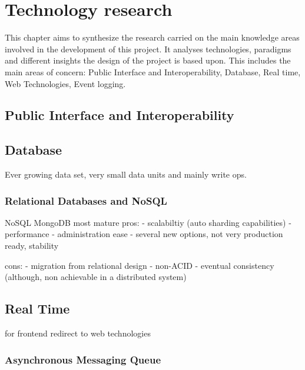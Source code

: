 \chapter{Technology research}

This chapter aims to synthesize the research carried on the main knowledge areas involved in the development of this project. It analyses technologies, paradigms and different insights the design of the project is based upon. This includes the main areas of concern: Public Interface and Interoperability, Database, Real time, Web Technologies, Event logging.   

\section{Public Interface and Interoperability}

\section{Database}

Ever growing data set, very small data units and mainly write ops.

\subsection{Relational Databases and NoSQL}

NoSQL
MongoDB most mature
pros:
- scalabiltiy (auto sharding capabilities)
- performance
- administration ease
- several new options, not very production ready, stability

cons: 
- migration from relational design 
- non-ACID
- eventual consistency (although, non achievable in a distributed system)

\section{Real Time}
for frontend redirect to web technologies

\subsection{Asynchronous Messaging Queue}

